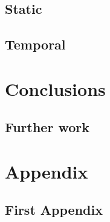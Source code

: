 \documentclass[a4paper,12pt,twoside,notitlepage,draft]{report}
\begin{document}
\section{Static}

\section{Temporal}

\chapter{Conclusions}
\section{Further work}



\appendix
\chapter*{Appendix}

\section{First Appendix}
\end{document}
